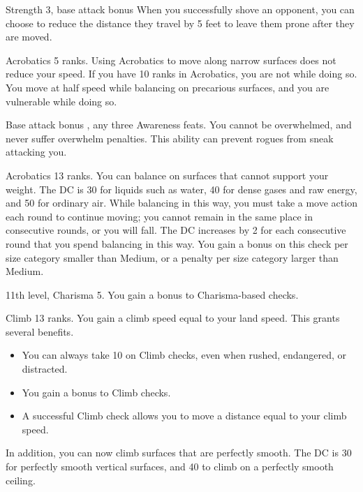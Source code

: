 \featpres Strength 3, base attack bonus 
\featben When you successfully shove an opponent, you can choose to reduce the distance they travel by 5 feet to leave them prone after they are moved.

\featpre Acrobatics 5 ranks.
\featben Using Acrobatics to move along narrow surfaces does not reduce your speed. If you have 10 ranks in Acrobatics, you are not \vulnerable while doing so.
 You move at half speed while balancing on precarious surfaces, and you are vulnerable while doing so.

\featpre Base attack bonus , any three Awareness feats.
\featben You cannot be overwhelmed, and never suffer overwhelm penalties. This ability can prevent rogues from sneak attacking you.

\featpre Acrobatics 13 ranks.
\featben You can balance on surfaces that cannot support your weight. The DC is 30 for liquids such as water, 40 for dense gases and raw energy, and 50 for ordinary air. While balancing in this way, you must take a move action each round to continue moving; you cannot remain in the same place in consecutive rounds, or you will fall. The DC increases by 2 for each consecutive round that you spend balancing in this way. You gain a  bonus on this check per size category smaller than Medium, or a  penalty per size category larger than Medium.

\featpre 11th level, Charisma 5.
\featben You gain a  bonus to Charisma-based checks.

\featpre Climb 13 ranks.
\featben You gain a climb speed equal to your land speed. This grants several benefits.
\begin{itemize}
  \item You can always take 10 on Climb checks, even when rushed, endangered, or distracted.
  \item You gain a  bonus to Climb checks.
  \item A successful Climb check allows you to move a distance equal to your climb speed.
\end{itemize}

In addition, you can now climb surfaces that are perfectly smooth. The DC is 30 for perfectly smooth vertical surfaces, and 40 to climb on a perfectly smooth ceiling.

